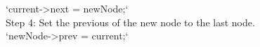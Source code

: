 \documentclass[preview]{standalone}
\begin{document}
`current->next = newNode;`\\Step 4: Set the previous of the new node to the last node.\\`newNode->prev = current;`\\
\end{document}
